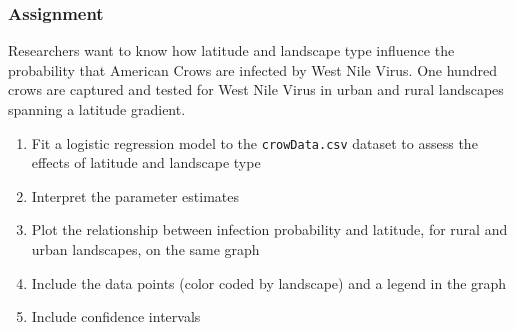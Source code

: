 \documentclass[color=usenames,dvipsnames]{beamer}\usepackage[]{graphicx}\usepackage[]{color}
\begin{document}






\begin{frame}
  \frametitle{Assignment}
  Researchers want to know how latitude and landscape type influence the
  probability that American Crows are infected by West Nile Virus. One
  hundred crows are captured and tested for West Nile Virus in urban
  and rural landscapes spanning a latitude gradient.
  \begin{enumerate}[\bf (1)]
    \item Fit a logistic regression model to the {\tt crowData.csv}
      dataset to assess the effects of latitude and landscape type
    \item Interpret the parameter estimates
    \item Plot the relationship between infection probability and
      latitude, for rural and urban landscapes, on the same graph
    \item Include the data points (color coded by landscape) and a legend in
      the graph
    \item Include confidence intervals
  \end{enumerate}
\end{frame}
\end{document}

